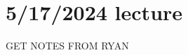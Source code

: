 \documentclass[class=article, crop=false]{standalone}
\begin{document}
\section{5/17/2024 lecture}
GET NOTES FROM RYAN
\end{document}
